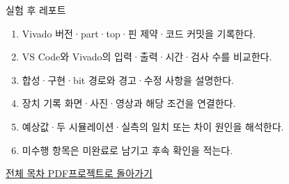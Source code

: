 \begin{frame}{실험 후 레포트}\relax
\small
\begin{enumerate}\setlength{\itemsep}{0.22cm}
\item Vivado 버전·part·top·핀 제약·코드 커밋을 기록한다.
\item VS Code와 Vivado의 입력·출력·시간·검사 수를 비교한다.
\item 합성·구현·bit 경로와 경고·수정 사항을 설명한다.
\item 장치 기록 화면·사진·영상과 해당 조건을 연결한다.
\item 예상값·두 시뮬레이션·실측의 일치 또는 차이 원인을 해석한다.
\item 미수행 항목은 미완료로 남기고 후속 확인을 적는다.
\end{enumerate}
\href{04.LAB1_00_CONTENTS.pdf}{전체 목차 PDF}\quad\href{https://github.com/Glaysia/fpga-lab-example-legacy-06-mux4to1/tree/80d65af6339ade695aad964c39f66efb37ac7367}{프로젝트로 돌아가기}
\end{frame}
\endgroup

